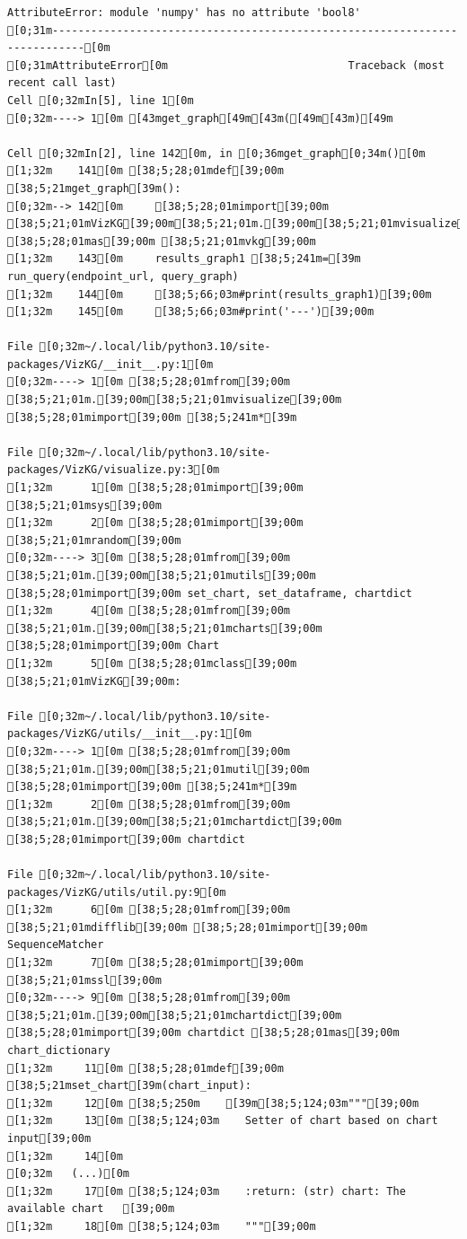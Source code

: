 \documentclass[
  letterpaper,
]{book}
\begin{document}
\begin{verbatim}
AttributeError: module 'numpy' has no attribute 'bool8'
[0;31m---------------------------------------------------------------------------[0m
[0;31mAttributeError[0m                            Traceback (most recent call last)
Cell [0;32mIn[5], line 1[0m
[0;32m----> 1[0m [43mget_graph[49m[43m([49m[43m)[49m

Cell [0;32mIn[2], line 142[0m, in [0;36mget_graph[0;34m()[0m
[1;32m    141[0m [38;5;28;01mdef[39;00m [38;5;21mget_graph[39m():
[0;32m--> 142[0m     [38;5;28;01mimport[39;00m [38;5;21;01mVizKG[39;00m[38;5;21;01m.[39;00m[38;5;21;01mvisualize[39;00m [38;5;28;01mas[39;00m [38;5;21;01mvkg[39;00m
[1;32m    143[0m     results_graph1 [38;5;241m=[39m run_query(endpoint_url, query_graph)
[1;32m    144[0m     [38;5;66;03m#print(results_graph1)[39;00m
[1;32m    145[0m     [38;5;66;03m#print('---')[39;00m

File [0;32m~/.local/lib/python3.10/site-packages/VizKG/__init__.py:1[0m
[0;32m----> 1[0m [38;5;28;01mfrom[39;00m [38;5;21;01m.[39;00m[38;5;21;01mvisualize[39;00m [38;5;28;01mimport[39;00m [38;5;241m*[39m

File [0;32m~/.local/lib/python3.10/site-packages/VizKG/visualize.py:3[0m
[1;32m      1[0m [38;5;28;01mimport[39;00m [38;5;21;01msys[39;00m
[1;32m      2[0m [38;5;28;01mimport[39;00m [38;5;21;01mrandom[39;00m
[0;32m----> 3[0m [38;5;28;01mfrom[39;00m [38;5;21;01m.[39;00m[38;5;21;01mutils[39;00m [38;5;28;01mimport[39;00m set_chart, set_dataframe, chartdict
[1;32m      4[0m [38;5;28;01mfrom[39;00m [38;5;21;01m.[39;00m[38;5;21;01mcharts[39;00m [38;5;28;01mimport[39;00m Chart
[1;32m      5[0m [38;5;28;01mclass[39;00m [38;5;21;01mVizKG[39;00m:

File [0;32m~/.local/lib/python3.10/site-packages/VizKG/utils/__init__.py:1[0m
[0;32m----> 1[0m [38;5;28;01mfrom[39;00m [38;5;21;01m.[39;00m[38;5;21;01mutil[39;00m [38;5;28;01mimport[39;00m [38;5;241m*[39m
[1;32m      2[0m [38;5;28;01mfrom[39;00m [38;5;21;01m.[39;00m[38;5;21;01mchartdict[39;00m [38;5;28;01mimport[39;00m chartdict

File [0;32m~/.local/lib/python3.10/site-packages/VizKG/utils/util.py:9[0m
[1;32m      6[0m [38;5;28;01mfrom[39;00m [38;5;21;01mdifflib[39;00m [38;5;28;01mimport[39;00m SequenceMatcher
[1;32m      7[0m [38;5;28;01mimport[39;00m [38;5;21;01mssl[39;00m
[0;32m----> 9[0m [38;5;28;01mfrom[39;00m [38;5;21;01m.[39;00m[38;5;21;01mchartdict[39;00m [38;5;28;01mimport[39;00m chartdict [38;5;28;01mas[39;00m chart_dictionary
[1;32m     11[0m [38;5;28;01mdef[39;00m [38;5;21mset_chart[39m(chart_input):
[1;32m     12[0m [38;5;250m    [39m[38;5;124;03m"""[39;00m
[1;32m     13[0m [38;5;124;03m    Setter of chart based on chart input[39;00m
[1;32m     14[0m 
[0;32m   (...)[0m
[1;32m     17[0m [38;5;124;03m    :return: (str) chart: The available chart   [39;00m
[1;32m     18[0m [38;5;124;03m    """[39;00m


\end{verbatim}
\end{document}
